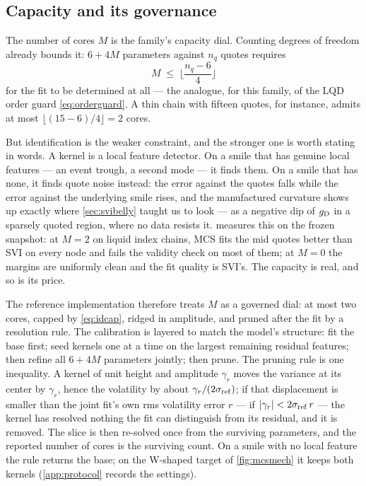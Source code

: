 \subsection{Capacity and its governance}
\label{sec:mcscapacity}

The number of cores $M$ is the family's capacity dial.  Counting
degrees of freedom already bounds it: $6+4M$ parameters against $n_q$
quotes requires
\begin{equation}
M\;\le\;\Big\lfloor\frac{n_q-6}{4}\Big\rfloor
\label{eq:idcap}
\end{equation}
for the fit to be determined at all --- the analogue, for this family,
of the LQD order guard \eqref{eq:orderguard}.  A thin chain with
fifteen quotes, for instance, admits at most
$\lfloor(15-6)/4\rfloor=2$ cores.

But identification is the weaker constraint, and the stronger one is
worth stating in words.  A kernel is a local feature detector.  On a
smile that has genuine local features --- an event trough, a second
mode --- it finds them.  On a smile that has none, it finds quote noise
instead: the error against the quotes falls while the error against
the underlying smile rises, and the manufactured curvature shows up
exactly where \cref{sec:svibelly} taught us to look --- as a negative
dip of $g_{\rm D}$ in a sparsely quoted region, where no data resists
it.   measures this on the frozen snapshot: at
$M=2$ on liquid index chains, MCS fits the mid quotes better than SVI
on every node and fails the validity check on most of them; at $M=0$
the margins are uniformly clean and the fit quality is SVI's.  The
capacity is real, and so is its price.

The reference implementation therefore treats $M$ as a governed dial:
at most two cores, capped by \eqref{eq:idcap}, ridged in amplitude,
and pruned after the fit by a resolution rule.  The calibration is
layered to match the model's structure: fit the base first; seed
kernels one at a time on the largest remaining residual features; then
refine all $6+4M$ parameters jointly; then prune.  The pruning rule is
one inequality.  A kernel of unit height and amplitude $\gamma_r$
moves the variance at its center by $\gamma_r$, hence the volatility
by about $\gamma_r/(2\sigma_{\rm ref})$; if that displacement is
smaller than the joint fit's own rms volatility error $r$ --- if
$|\gamma_r|<2\sigma_{\rm ref}\,r$ --- the kernel has resolved nothing
the fit can distinguish from its residual, and it is removed.  The
slice is then re-solved once from the surviving parameters, and the
reported number of cores is the surviving count.  On a smile with no
local feature the rule returns the base; on the W-shaped target of
\cref{fig:mcsmech} it keeps both kernels (\cref{app:protocol}
records the settings).
